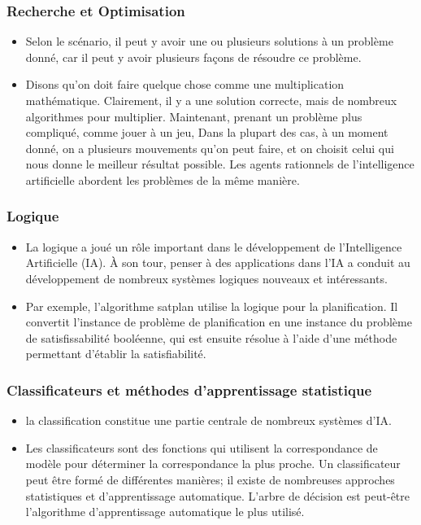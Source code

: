 \documentclass{beamer}
\begin{document}
	\begin{frame}
		\frametitle{Recherche et Optimisation}
		\begin{itemize}
		    \item Selon le scénario, il peut y avoir une ou plusieurs solutions à un problème donné, car il peut y avoir plusieurs façons de résoudre ce problème. 
		    \item Disons qu'on doit faire quelque chose comme une multiplication mathématique. Clairement, il y a une solution correcte, mais de nombreux algorithmes pour multiplier. Maintenant, prenant un problème plus compliqué, comme jouer à un jeu, Dans la plupart des cas, à un moment donné, on a plusieurs mouvements qu'on peut faire, et on choisit celui qui nous donne le meilleur résultat possible. Les agents rationnels de l'intelligence artificielle abordent les problèmes de la même manière.
		\end{itemize}
	\end{frame}
	
	
	\begin{frame}
		\frametitle{Logique}
		\begin{itemize}
		    \item La logique a joué un rôle important dans le développement de l'Intelligence Artificielle (IA). À son tour, penser à des applications dans l'IA a conduit au développement de nombreux systèmes logiques nouveaux et intéressants.
		    \item Par exemple, l'algorithme satplan utilise la logique pour la planification. Il convertit l'instance de problème de planification en une instance du problème de satisfissabilité booléenne, qui est ensuite résolue à l'aide d'une méthode permettant d'établir la satisfiabilité.
		\end{itemize}
	\end{frame}
	
	
	\begin{frame}
		\frametitle{Classificateurs et méthodes d'apprentissage statistique}
		\begin{itemize}
			\item la classification constitue une partie centrale de nombreux systèmes d'IA. 
             \item Les classificateurs sont des fonctions qui utilisent la correspondance de modèle pour déterminer la correspondance la plus proche. Un classificateur peut être formé de différentes manières; il existe de nombreuses approches statistiques et d'apprentissage automatique. L'arbre de décision est peut-être l'algorithme d'apprentissage automatique le plus utilisé.
		\end{itemize}
	\end{frame}
	
\end{document}
